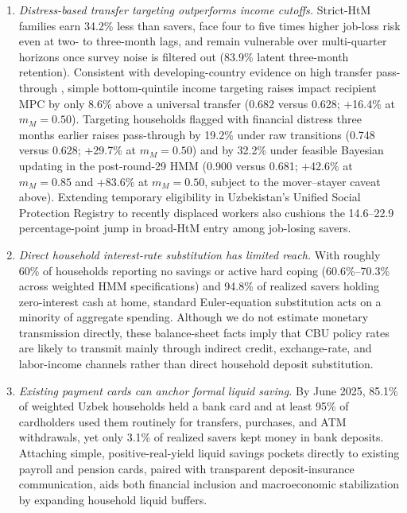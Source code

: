 \documentclass[11pt]{article}
\begin{document}
\begin{enumerate}
\item \textit{Distress-based transfer targeting outperforms income cutoffs.} Strict-HtM families earn 34.2\% less than savers, face four to five times higher job-loss risk even at two- to three-month lags, and remain vulnerable over multi-quarter horizons once survey noise is filtered out (83.9\% latent three-month retention). Consistent with developing-country evidence on high transfer pass-through \citep{egger2022general}, simple bottom-quintile income targeting raises impact recipient MPC by only 8.6\% above a universal transfer (0.682 versus 0.628; +16.4\% at $m_M = 0.50$). Targeting households flagged with financial distress three months earlier raises pass-through by 19.2\% under raw transitions (0.748 versus 0.628; +29.7\% at $m_M = 0.50$) and by 32.2\% under feasible Bayesian updating in the post-round-29 HMM (0.900 versus 0.681; +42.6\% at $m_M = 0.85$ and +83.6\% at $m_M = 0.50$, subject to the mover--stayer caveat above). Extending temporary eligibility in Uzbekistan's Unified Social Protection Registry to recently displaced workers also cushions the 14.6--22.9 percentage-point jump in broad-HtM entry among job-losing savers.
\item \textit{Direct household interest-rate substitution has limited reach.} With roughly 60\% of households reporting no savings or active hard coping (60.6\%--70.3\% across weighted HMM specifications) and 94.8\% of realized savers holding zero-interest cash at home, standard Euler-equation substitution acts on a minority of aggregate spending. Although we do not estimate monetary transmission directly, these balance-sheet facts imply that CBU policy rates are likely to transmit mainly through indirect credit, exchange-rate, and labor-income channels rather than direct household deposit substitution.
\item \textit{Existing payment cards can anchor formal liquid saving.} By June 2025, 85.1\% of weighted Uzbek households held a bank card and at least 95\% of cardholders used them routinely for transfers, purchases, and ATM withdrawals, yet only 3.1\% of realized savers kept money in bank deposits. Attaching simple, positive-real-yield liquid savings pockets directly to existing payroll and pension cards, paired with transparent deposit-insurance communication, aids both financial inclusion and macroeconomic stabilization by expanding household liquid buffers.
\end{enumerate}
\end{document}
